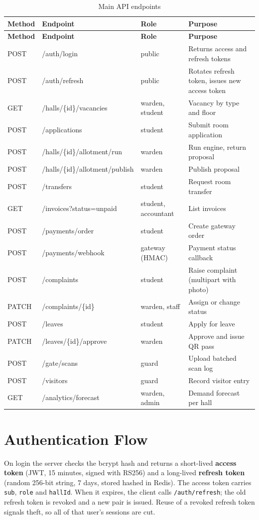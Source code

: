 \documentclass[11pt,a4paper]{report}
\begin{document}
\begin{longtable}{p{1.3cm}p{5.4cm}p{2.6cm}p{5.2cm}}
\caption{Main API endpoints}\label{tab:api}\\
\toprule
\textbf{Method} & \textbf{Endpoint} & \textbf{Role} & \textbf{Purpose}\\
\midrule\endfirsthead
\toprule
\textbf{Method} & \textbf{Endpoint} & \textbf{Role} & \textbf{Purpose}\\
\midrule\endhead
POST & /auth/login & public & Returns access and refresh tokens\\
POST & /auth/refresh & public & Rotates refresh token, issues new access token\\
GET & /halls/\{id\}/vacancies & warden, student & Vacancy by type and floor\\
POST & /applications & student & Submit room application\\
POST & /halls/\{id\}/allotment/run & warden & Run engine, return proposal\\
POST & /halls/\{id\}/allotment/publish & warden & Publish proposal\\
POST & /transfers & student & Request room transfer\\
GET & /invoices?status=unpaid & student, accountant & List invoices\\
POST & /payments/order & student & Create gateway order\\
POST & /payments/webhook & gateway (HMAC) & Payment status callback\\
POST & /complaints & student & Raise complaint (multipart with photo)\\
PATCH & /complaints/\{id\} & warden, staff & Assign or change status\\
POST & /leaves & student & Apply for leave\\
PATCH & /leaves/\{id\}/approve & warden & Approve and issue QR pass\\
POST & /gate/scans & guard & Upload batched scan log\\
POST & /visitors & guard & Record visitor entry\\
GET & /analytics/forecast & warden, admin & Demand forecast per hall\\
\bottomrule
\end{longtable}

\section{Authentication Flow}
On login the server checks the bcrypt hash and returns a short-lived \textbf{access token} (JWT, 15 minutes, signed with RS256) and a long-lived \textbf{refresh token} (random 256-bit string, 7 days, stored hashed in Redis). The access token carries \texttt{sub}, \texttt{role} and \texttt{hallId}. When it expires, the client calls \texttt{/auth/refresh}; the old refresh token is revoked and a new pair is issued. Reuse of a revoked refresh token signals theft, so all of that user's sessions are cut.
\end{document}

